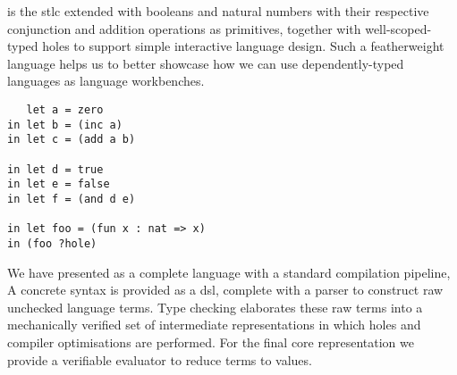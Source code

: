 

\Velo{} is the \ac{stlc} extended with booleans and natural numbers with their respective conjunction and addition operations as primitives, together with well-scoped-typed holes to support simple interactive language design.
Such a featherweight language helps us to better showcase how we can use dependently-typed languages as language workbenches.

\begin{verbatim}
   let a = zero
in let b = (inc a)
in let c = (add a b)

in let d = true
in let e = false
in let f = (and d e)

in let foo = (fun x : nat => x)
in (foo ?hole)

\end{verbatim}

We have presented \Velo{} as a complete language with a standard compilation pipeline,
A concrete syntax is provided as a \ac{dsl}, complete with a parser to construct raw unchecked language terms.
Type checking elaborates these raw terms into a mechanically verified set of intermediate representations in which holes and compiler optimisations are performed.
For the final core representation we provide a verifiable evaluator to reduce terms to values.



